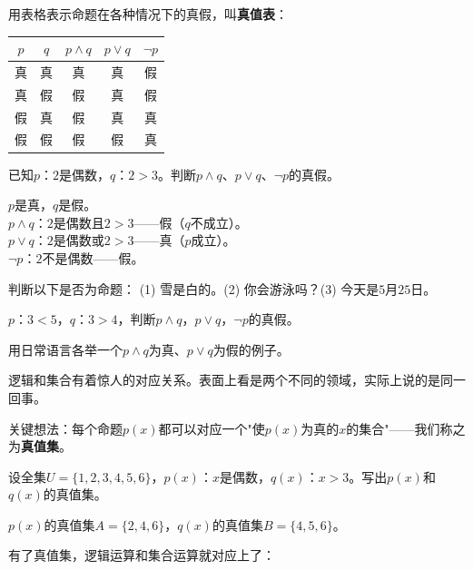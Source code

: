 用表格表示命题在各种情况下的真假，叫\textbf{真值表}：

\begin{center}
\begin{tabular}{c|c|c|c|c}
$p$ & $q$ & $p\land q$ & $p\lor q$ & $\lnot p$ \\ \hline
真 & 真 & 真 & 真 & 假 \\
真 & 假 & 假 & 真 & 假 \\
假 & 真 & 假 & 真 & 真 \\
假 & 假 & 假 & 假 & 真
\end{tabular}
\end{center}

\begin{example}
已知$p$：$2$是偶数，$q$：$2>3$。判断$p\land q$、$p\lor q$、$\lnot p$的真假。
\end{example}
\begin{solution}
$p$是真，$q$是假。\\
$p\land q$：$2$是偶数且$2>3$——假（$q$不成立）。\\
$p\lor q$：$2$是偶数或$2>3$——真（$p$成立）。\\
$\lnot p$：$2$不是偶数——假。
\end{solution}

\begin{exercise}
\item 判断以下是否为命题：
(1) 雪是白的。\qquad (2) 你会游泳吗？\qquad (3) 今天是$5$月$25$日。
\item $p$：$3<5$，$q$：$3>4$，判断$p\land q$，$p\lor q$，$\lnot p$的真假。
\item 用日常语言各举一个$p\land q$为真、$p\lor q$为假的例子。
\end{exercise}


逻辑和集合有着惊人的对应关系。表面上看是两个不同的领域，实际上说的是同一回事。

关键想法：每个命题$p(x)$都可以对应一个"使$p(x)$为真的$x$的集合"——我们称之为\textbf{真值集}。

\begin{example}
设全集$U=\{1,2,3,4,5,6\}$，$p(x)$：$x$是偶数，$q(x)$：$x>3$。写出$p(x)$和$q(x)$的真值集。
\end{example}
\begin{solution}
$p(x)$的真值集$A=\{2,4,6\}$，$q(x)$的真值集$B=\{4,5,6\}$。
\end{solution}

有了真值集，逻辑运算和集合运算就对应上了：

